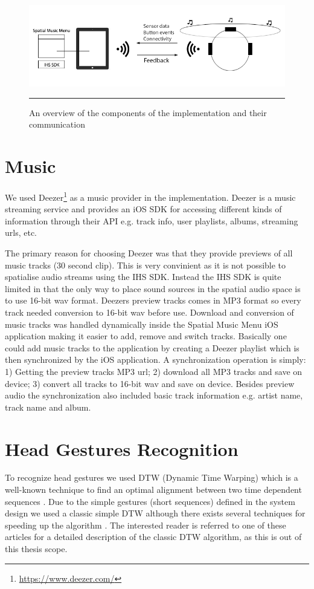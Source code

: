 \begin{figure}[htbp]
	\centering
		\includegraphics[width=\textwidth,height=\textheight,keepaspectratio]{./Figures/implementation_overview.png}
		\rule{35em}{1pt}
	\caption[Implementation overview]{An overview of the components of the implementation and their communication}
	\label{fig:implementationoverview}
\end{figure}


\section{Music}
We used Deezer\footnote{\url{https://www.deezer.com/}} as a music provider in the implementation. Deezer is a music streaming service and provides an iOS SDK for accessing different kinds of information through their API e.g. track info, user playlists, albums, streaming urls, etc.

The primary reason for choosing Deezer was that they provide previews of all music tracks (30 second clip). This is very convinient as it is not possible to spatialise audio streams using the IHS SDK. Instead the IHS SDK is quite limited in that the only way to place sound sources in the spatial audio space is to use 16-bit wav format. Deezers preview tracks comes in MP3 format so every track needed conversion to 16-bit wav before use. Download and conversion of music tracks was handled dynamically inside the Spatial Music Menu iOS application making it easier to add, remove and switch tracks. Basically one could add music tracks to the application by creating a Deezer playlist which is then synchronized by the iOS application. A synchronization operation is simply: 1) Getting the preview tracks MP3 url; 2) download all MP3 tracks and save on device; 3) convert all tracks to 16-bit wav and save on device. Besides preview audio the synchronization also included basic track information e.g. artist name, track name and album.


\section{Head Gestures Recognition}
To recognize head gestures we used DTW (Dynamic Time Warping) which is a well-known technique to find an optimal alignment between two time dependent sequences \cite{muller_dynamic_2007}. Due to the simple gestures (short sequences) defined in the system design we used a classic simple DTW although there exists several techniques for speeding up the algorithm \cite{muller_dynamic_2007,salvador_toward_2007,akl_accelerometer-based_2010}. The interested reader is referred to one of these articles for a detailed description of the classic DTW algorithm, as this is out of this thesis scope.

